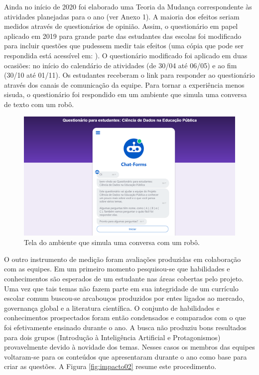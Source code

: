 \documentclass[
]{book}
\begin{document}
Ainda no início de 2020 foi elaborado uma Teoria da Mudança correspondente às atividades planejadas para o ano (ver Anexo 1). A maioria dos efeitos seriam medidos através de questionários de opinião. Assim, o questionário em papel aplicado em 2019 para grande parte das estudantes das escolas foi modificado para incluir questões que pudessem medir tais efeitos (uma cópia que pode ser respondida está acessível em: \href{https://forms.gle/QP9crYYY6x1XhF7RA}{}). O questionário modificado foi aplicado em duas ocasiões: no início do calendário de atividades (de 30/04 até 06/05) e ao fim (30/10 até 01/11). Os estudantes receberam o link para responder ao questionário através dos canais de comunicação da equipe. Para tornar a experiência menos sisuda, o questionário foi respondido em um ambiente que simula uma conversa de texto com um robô.

\begin{figure}

{\centering \includegraphics[width=1\linewidth,height=0.8\textheight]{images/Impactos/01} 

}

\caption{Tela do ambiente que simula uma conversa com um robô.}\label{fig:impacto01}
\end{figure}

O outro instrumento de medição foram avaliações produzidas em colaboração com as equipes. Em um primeiro momento pesquisou-se que habilidades e conhecimentos são esperados de um estudante nas áreas cobertas pelo projeto. Uma vez que tais temas não fazem parte em sua integridade de um currículo escolar comum buscou-se arcabouços produzidos por entes ligados ao mercado, governança global e a literatura científica. O conjunto de habilidades e conhecimentos prospectados foram então condensados e comparados com o que foi efetivamente ensinado durante o ano. A busca não produziu bons resultados para dois grupos (Introdução à Inteligência Artificial e Protagonismos) provavelmente devido à novidade dos temas. Nesses casos os membros das equipes voltaram-se para os conteúdos que apresentaram durante o ano como base para criar as questões. A Figura \ref{fig:impacto02} resume este procedimento.
\end{document}
